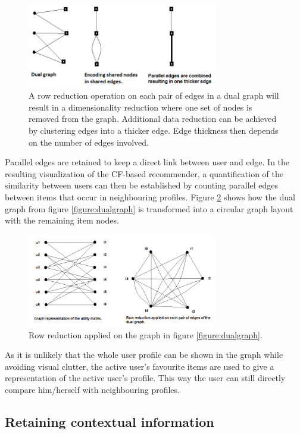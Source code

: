 \documentclass[a4paper,10pt,twocolumn]{article}
\begin{document}
\begin{figure}
	\includegraphics[width=8.3cm]{img/row_reduction}
	\caption{A row reduction operation on each pair of edges in a dual graph will result in a dimensionality reduction where one set of nodes is removed from the graph. Additional data reduction can be achieved by clustering edges into a thicker edge. Edge thickness then depends on the number of edges involved.}
	\label{figure:rowreduction}
\end{figure}

Parallel edges are retained to keep a direct link between user and edge. In the resulting visualization of the CF-based recommender, a quantification of the similarity between users can then be established by counting parallel edges between items that occur in neighbouring profiles. Figure \ref{figure:rowreduction_dualgraph} shows how the dual graph from figure \ref{figure:dualgraph} is transformed into a circular graph layout with the remaining item nodes.

\begin{figure}
	\includegraphics[width=8.3cm]{img/dualgraph_rowreduction}
	\caption{Row reduction applied on the graph in figure \ref{figure:dualgraph}.}
	\label{figure:rowreduction_dualgraph}
\end{figure}

As it is unlikely that the whole user profile can be shown in the graph while avoiding visual clutter, the active user's favourite items are used to give a representation of the active user's profile. This way the user can still directly compare him/herself with neighbouring profiles.


\subsection{Retaining contextual information}\label{section:design:subsection:contextual}
\end{document}
